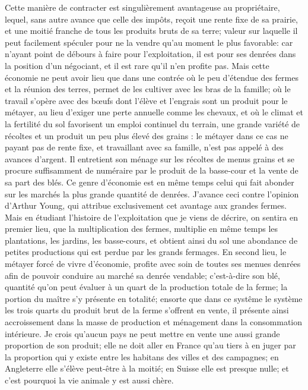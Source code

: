 Cette manière de contracter est singulièrement avantageuse au propriétaire, lequel, sans autre avance que celle des impôts, reçoit une rente fixe de sa prairie, et une moitié franche de tous les produits bruts de sa terre; valeur sur laquelle il peut facilement spéculer pour ne la vendre qu'au moment le plus favorable: car n'ayant point de débours à faire pour l'exploitation, il est pour ses denrées dans la position d'un négociant, et il est rare qu'il n'en profite pas. Mais cette économie ne peut avoir lieu que dans une contrée où le peu d'étendue des fermes et la réunion des terres, permet de les cultiver avec les bras de la famille; où le travail s'opère avec des bœufs dont l'élève et l'engrais sont un produit pour le métayer, au lieu d'exiger une perte annuelle comme les chevaux, et où le climat\setcounter{page}{401} et la fertilité du sol favorisent un emploi continuel du terrain, une grande variété de récoltes et un produit un peu plus élevé des grains : le métayer dans ce cas ne payant pas de rente fixe, et travaillant avec sa famille, n'est pas appelé à des avances d'argent. Il entretient son ménage sur les récoltes de menus grains et se procure suffisamment de numéraire par le produit de la basse-cour et la vente de sa part des blés.
Ce genre d'économie est en même temps celui qui fait abonder sur les marchés la plus grande quantité de denrées. J'avance ceci contre l'opinion d'Arthur Young, qui attribue exclusivement cet avantage aux grandes fermes. Mais en étudiant l'histoire de l'exploitation que je viens de décrire, on sentira en premier lieu, que la multiplication des fermes, multiplie en même temps les plantations, les jardins, les basse-cours, et obtient ainsi du sol une abondance de petites productions qui est perdue par les grands fermages. En second lieu, le métayer forcé de vivre d'économie, profite avec soin de toutes ses menues denrées afin de pouvoir conduire au marché sa denrée vendable; c'est-à-dire son blé, quantité qu'on peut évaluer à un quart de la production totale de la ferme; la portion du maître s'y présente en totalité; ensorte que dans ce systême\setcounter{page}{402} le système les trois quarts du produit brut de la ferme s'offrent en vente, il présente ainsi accroissement dans la masse de production et ménagement dans la consommation intérieure. Je crois qu'aucun pays ne peut mettre en vente une aussi grande proportion de son produit; elle ne doit aller en France qu'au tiers à en juger par la proportion qui y existe entre les habitans des villes et des campagnes; en Angleterre elle s'élève peut-être à la moitié; en Suisse elle est presque nulle; et c'est pourquoi la vie animale y est aussi chère.
